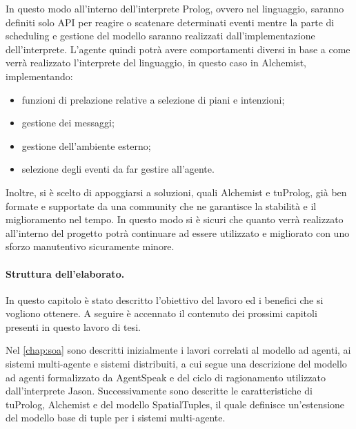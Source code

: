 In questo modo all'interno dell'interprete Prolog, ovvero nel linguaggio, saranno definiti solo API per reagire o scatenare determinati eventi mentre la parte di scheduling e gestione del modello saranno realizzati dall'implementazione dell'interprete.
L'agente quindi potrà avere comportamenti diversi in base a come verrà realizzato l'interprete del linguaggio, in questo caso in Alchemist, implementando:
\begin{itemize}
\item funzioni di prelazione relative a selezione di piani e intenzioni;
\item gestione dei messaggi;
\item gestione dell'ambiente esterno;
\item selezione degli eventi da far gestire all'agente.
\end{itemize}

Inoltre, si è scelto di appoggiarsi a soluzioni, quali Alchemist e tuProlog, già ben formate e supportate da una community che ne garantisce la stabilità e il miglioramento nel tempo.
In questo modo si è sicuri che quanto verrà realizzato all'interno del progetto potrà continuare ad essere utilizzato e migliorato con uno sforzo manutentivo sicuramente minore.

\paragraph{Struttura dell'elaborato.}
In questo capitolo è stato descritto l'obiettivo del lavoro ed i benefici che si vogliono ottenere.
A seguire è accennato il contenuto dei prossimi capitoli presenti in questo lavoro di tesi.

Nel \cref{chap:soa} sono descritti inizialmente i lavori correlati al modello ad agenti, ai sistemi multi-agente e sistemi distribuiti, a cui segue una descrizione del modello ad agenti formalizzato da AgentSpeak e del ciclo di ragionamento utilizzato dall'interprete Jason.
Successivamente sono descritte le caratteristiche di tuProlog, Alchemist e del modello SpatialTuples, il quale definisce un'estensione del modello base di tuple per i sistemi multi-agente.

